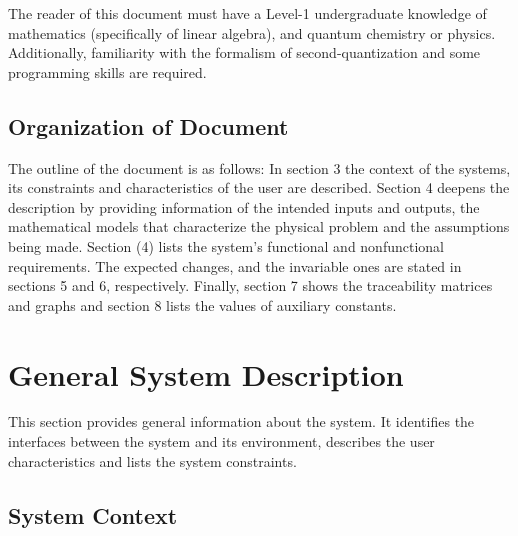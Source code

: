 \documentclass[12pt]{article}
\begin{document}
The reader of this document must have a Level-1 undergraduate knowledge of 
mathematics 
(specifically of linear algebra), and quantum chemistry or physics. 
Additionally, familiarity with the formalism of second-quantization and some 
programming skills are required.

\subsection{Organization of Document}

	The outline of the document is as follows: In section 3 the context of the 
systems, its constraints and characteristics of the user are described. Section 
4 deepens the description by providing information of the intended inputs and 
outputs, the mathematical models that characterize the physical problem and the 
assumptions being made. Section (4) lists the system's functional and 
nonfunctional requirements. The expected changes, and the invariable ones are 
stated in sections 5 and 6, respectively. Finally, section 7 shows the 
traceability matrices and graphs and section 8 lists the values of auxiliary 
constants.

\section{General System Description}

This section provides general information about the system.  It identifies the
interfaces between the system and its environment, describes the user
characteristics and lists the system constraints. 
%

\subsection{System Context}
\end{document}
